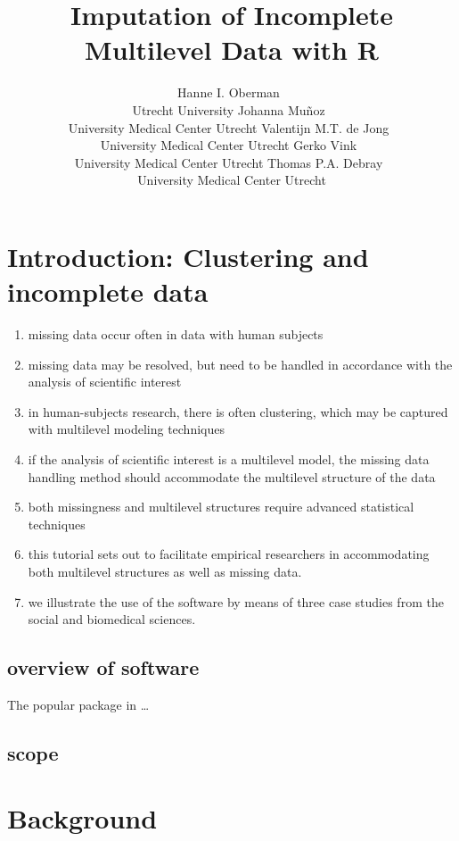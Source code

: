 \documentclass[
  article]{jss}
\author{Hanne I. Oberman~\orcidlink{0000-0003-3276-2141}\\Utrecht
University \And Johanna
Muñoz~\orcidlink{0000-0002-2384-5415}\\University Medical Center
Utrecht \AND Valentijn M.T. de
Jong~\orcidlink{0000-0001-9921-3468}\\University Medical Center
Utrecht \And Gerko Vink~\orcidlink{0000-0001-9767-1924}\\University
Medical Center Utrecht \AND Thomas P.A.
Debray~\orcidlink{0000-0002-1790-2719}\\University Medical Center
Utrecht}
\title{Imputation of Incomplete Multilevel Data with R}
\providecommand{\tightlist}{%
  \setlength{\itemsep}{0pt}\setlength{\parskip}{0pt}}\usepackage{longtable,booktabs,array}
\begin{document}
\maketitle
\hypertarget{sec-intro}{%
\section{Introduction: Clustering and incomplete data}\label{sec-intro}}

\begin{enumerate}
\def\labelenumi{\arabic{enumi}.}
\tightlist
\item
  missing data occur often in data with human subjects
\item
  missing data may be resolved, but need to be handled in accordance
  with the analysis of scientific interest
\item
  in human-subjects research, there is often clustering, which may be
  captured with multilevel modeling techniques
\item
  if the analysis of scientific interest is a multilevel model, the
  missing data handling method should accommodate the multilevel
  structure of the data
\item
  both missingness and multilevel structures require advanced
  statistical techniques
\item
  this tutorial sets out to facilitate empirical researchers in
  accommodating both multilevel structures as well as missing data.
\item
  we illustrate the use of the software by means of three case studies
  from the social and biomedical sciences.
\end{enumerate}

\hypertarget{overview-of-software}{%
\subsection{overview of software}\label{overview-of-software}}

The popular  package in  \citet{R}\ldots{}

\hypertarget{scope}{%
\subsection{scope}\label{scope}}

\hypertarget{sec-models}{%
\section{Background}\label{sec-models}}
\end{document}
